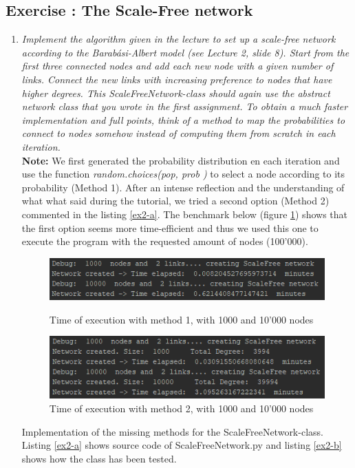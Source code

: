 \documentclass[10pt,a4paper]{article}
\newcommand{\exercise}[1]
{
  \stepcounter{subsection}
  \subsection*{Exercise \thesubsection: #1}

}
\begin{document}
\exercise{The Scale-Free network}
\begin{enumerate}
\item \textit{Implement the algorithm given in the lecture to set up a scale-free network according to the
	Barabási-Albert model (see Lecture 2, slide 8). Start from the first three connected nodes
	and add each new node with a given number of links. Connect the new links with increasing
	preference to nodes that have higher degrees. This ScaleFreeNetwork-class should again
	use the abstract network class that you wrote in the first assignment.
	To obtain a much faster implementation and full points, think of a method to map the
	probabilities to connect to nodes somehow instead of computing them from scratch in each
	iteration.}\\

\textbf{Note:} We first generated the probability distribution en each iteration and use the function \textit{random.choices(pop, prob
	)} to select a node according to its probability (Method 1). After an intense reflection and the understanding of what what said during the tutorial, we tried a second option (Method 2) commented in the listing \ref{ex2-a}. The benchmark below (figure \ref{fig:timemethod1}) shows that the first option seems more time-efficient and thus we used this one to execute the program with the requested amount of nodes (100'000). 


\begin{figure}[H]
	\centering
	\includegraphics[width=0.7\linewidth]{img/time_method1}
	\caption{Time of execution with method 1, with 1000 and 10'000 nodes}
	\includegraphics[width=0.7\linewidth]{img/time_method2}
	\caption{Time of execution with method 2, with 1000 and 10'000 nodes}
	\label{fig:timemethod1}
\end{figure}


Implementation of the missing methods for the ScaleFreeNetwork-class. Listing \ref{ex2-a} shows source code of ScaleFreeNetwork.py and listing \ref{ex2-b} shows how the class has been tested.


\end{enumerate}
\end{document}
